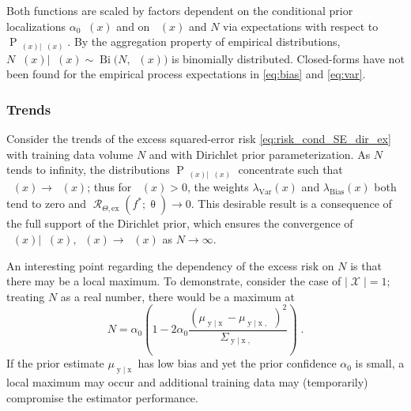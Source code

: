 \documentclass{article}
\DeclareMathOperator{\xrm}{\mathrm{x}}
\DeclareMathOperator{\yrm}{\mathrm{y}}
\DeclareMathOperator{\Prm}{\mathrm{P}}
\DeclareMathOperator{\Xcal}{\mathcal{X}}
\DeclareMathOperator{\Rcal}{\mathcal{R}}
\DeclareMathOperator{\Bi}{\mathrm{Bi}}
\DeclareMathOperator{\thetam}{\theta_\text{m}}
\DeclareMathOperator{\upthetam}{\uptheta_\text{m}}
\DeclareMathOperator{\upthetac}{\uptheta_\text{c}}
\DeclareMathOperator{\uppsim}{\uppsi_\text{m}}
\DeclareMathOperator{\uppsic}{\uppsi_\text{c}}
\DeclareMathOperator{\alpham}{\alpha_\text{m}}
\begin{document}
Both functions are scaled by factors dependent on the conditional prior localizations $\alpha_0 \alpham(x)$ and on $\upthetam(x)$ and $N$ via expectations with respect to $\Prm_{\uppsim(x) | \upthetam(x)}$. By the aggregation property of empirical distributions, $N \uppsim(x) | \upthetam(x) \sim \Bi\big(N,\upthetam(x)\big)$ is binomially distributed. Closed-forms have not been found for the empirical process expectations in \eqref{eq:bias} and \eqref{eq:var}.




\subsubsection{Trends}

Consider the trends of the excess squared-error risk \eqref{eq:risk_cond_SE_dir_ex} with training data volume $N$ and with Dirichlet prior parameterization. As $N$ tends to infinity, the distributions $\Prm_{\uppsim(x) | \upthetam(x)}$ concentrate such that $\uppsim(x) \to \thetam(x)$; thus for $\thetam(x) > 0$, the weights $\lambda_{\text{Var}}(x)$ and $\lambda_{\text{Bias}}(x)$ both tend to zero and $\Rcal_{\Theta, \mathrm{ex}}(f^* ; \uptheta) \to 0$. This desirable result is a consequence of the full support of the Dirichlet prior, which ensures the convergence of $\upthetac(x) | \uppsim(x),\uppsic(x) \to \uppsic(x)$ as $N \to \infty$.

An interesting point regarding the dependency of the excess risk on $N$ is that there may be a local maximum. To demonstrate, consider the case of $|\Xcal| = 1$; treating $N$ as a real number, there would be a maximum at 
\begin{equation}
N = \alpha_0 \left( 1 - 2 \alpha_0 \frac{\left( \mu_{\yrm | \xrm} - \mu_{\yrm | \xrm,\upthetac} \right)^2}{\Sigma_{\yrm | \xrm,\upthetac}} \right) \;.
\end{equation}
If the prior estimate $\mu_{\yrm | \xrm}$ has low bias and yet the prior confidence $\alpha_0$ is small, a local maximum may occur and additional training data may (temporarily) compromise the estimator performance. 
\end{document}
